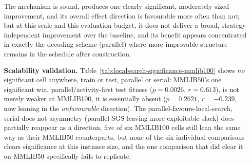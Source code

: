  The mechanism is
sound, produces one clearly significant, moderately sized improvement, and
its overall effect direction is favourable more often than not; but at this
scale and this evaluation budget, it does not deliver a broad,
strategy-independent improvement over the baseline, and its benefit appears
concentrated in exactly the decoding scheme (parallel) where more
improvable structure remains in the schedule after construction.

\textbf{Scalability validation.}  Table~\ref{tab:localsearch-significance-mmlib100}
shows \emph{no} significant cell anywhere, train or test, parallel or
serial: MMLIB50's one significant win, parallel/activity-first test fitness
($p=0.0026$, $r=0.613$), is not merely weaker at MMLIB100, it is essentially
absent ($p=0.2621$, $r=-0.239$, now leaning in the \emph{unfavourable}
direction). The parallel-favours-local-search, serial-does-not asymmetry
 (parallel SGS leaving more exploitable
slack) does partially reappear as a direction, five of six MMLIB100 cells
still lean the same way as their MMLIB50 counterparts, but none of the six
individual comparisons clears significance at this instance size, and the
one comparison that did clear it on MMLIB50 specifically fails to replicate.

